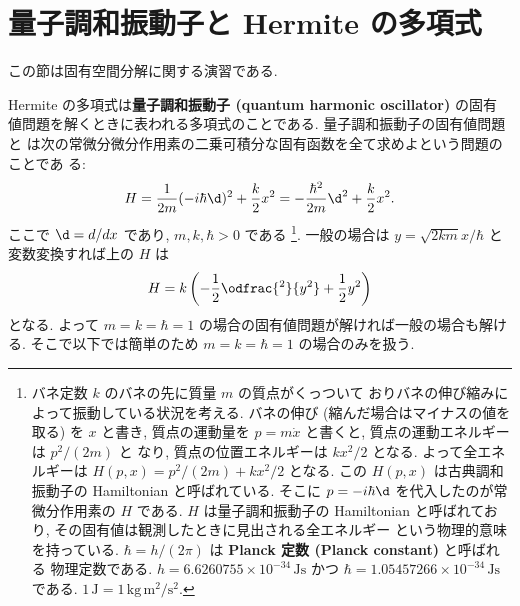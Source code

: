 \documentclass[12pt,twoside]{jarticle}
\begin{document}
\section{量子調和振動子と Hermite の多項式}
\label{sec:Hermite-polynomials}

この節は固有空間分解に関する演習である.

Hermite の多項式は{\bf 量子調和振動子 (quantum harmonic oscillator)} の固有
値問題を解くときに表われる多項式のことである.  量子調和振動子の固有値問題と
は次の常微分微分作用素の二乗可積分な固有函数を全て求めよという問題のことであ
る:
\begin{equation*}
  H = \frac{1}{2m} (-i\hbar \d)^2 + \frac{k}{2} x^2
  = -\frac{\hbar^2}{2m}\d^2 + \frac{k}{2}x^2.
\end{equation*}
ここで $\d = d/dx$ であり, $m,k,\hbar > 0$ である%
\footnote{バネ定数 $k$ のバネの先に質量 $m$ の質点がくっついて
  おりバネの伸び縮みによって振動している状況を考える.
  バネの伸び (縮んだ場合はマイナスの値を取る) を $x$ と書き, 
  質点の運動量を $p=m\dot x$ と書くと, 質点の運動エネルギーは $p^2/(2m)$ と
  なり, 質点の位置エネルギーは $kx^2/2$ となる.  
  よって全エネルギーは $H(p,x) = p^2/(2m) + kx^2/2$ となる.
  この $H(p,x)$ は古典調和振動子の Hamiltonian と呼ばれている.
  そこに $p=-i\hbar\d$ を代入したのが常微分作用素の $H$ である.
  $H$ は量子調和振動子の Hamiltonian と呼ばれており, 
  その固有値は観測したときに見出される全エネルギー
  という物理的意味を持っている. 
  $\hbar=h/(2\pi)$ は {\bf Planck 定数 (Planck constant)} と呼ばれる
  物理定数である.  $h = 6.6260755\times10^{-34}\,\mathrm{Js}$ 
  かつ $\hbar = 1.05457266\times10^{-34}\,\mathrm{Js}$ である.
  $1\,\mathrm{J} = 1\,\mathrm{kg\,m^2/s^2}$.}.
一般の場合は $y = \sqrt{2km}x/\hbar$ と
変数変換すれば上の $H$ は
\begin{equation*}
  H = k \left( -\frac{1}{2}\odfrac{^2}{y^2} + \frac{1}{2}y^2 \right)
\end{equation*}
となる.  よって $m=k=\hbar=1$ の場合の固有値問題が解ければ一般の場合も解ける.
そこで以下では簡単のため $m=k=\hbar=1$ の場合のみを扱う.  

\end{document}
